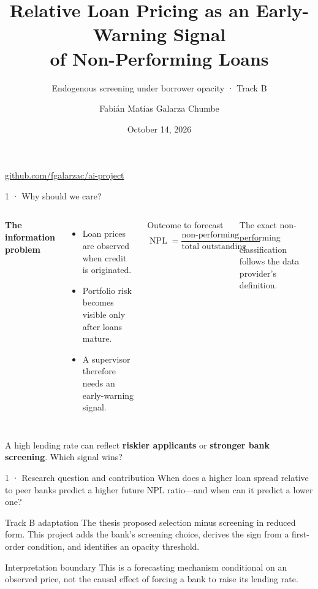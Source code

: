 \documentclass[aspectratio=169,11pt]{beamer}
\title{Relative Loan Pricing as an Early-Warning Signal\\of Non-Performing Loans}
\subtitle{Endogenous screening under borrower opacity · Track B}
\author{Fabián Matías Galarza Chumbe}
\date{October 14, 2026}
\newcommand{\npl}{\operatorname{NPL}}
\begin{document}
\begin{frame}[plain]
  \titlepage
  \vspace{-0.6em}
  \begin{center}\small
    \href{https://github.com/fgalarzac/ai-project}{github.com/fgalarzac/ai-project}
  \end{center}
\end{frame}

\begin{frame}{1 · Why should we care?}
  \begin{columns}[T,onlytextwidth]
      \textbf{The information problem}
      \begin{itemize}
        \item Loan prices are observed when credit is originated.
        \item Portfolio risk becomes visible only after loans mature.
        \item A supervisor therefore needs an \alert{early-warning signal}.
      \end{itemize}
      \begin{block}{Outcome to forecast}
        \centering
        \(\npl=\dfrac{\text{non-performing balance}}
        {\text{total outstanding balance}}\)
      \end{block}
      \small The exact non-performing classification follows the data
      provider's definition.
  \end{columns}
  \vfill
  \centering
  A high lending rate can reflect \textbf{riskier applicants} or
  \textbf{stronger bank screening}. Which signal wins?
\end{frame}

\begin{frame}{1 · Research question and contribution}
  \Large
  When does a higher loan spread relative to peer banks predict a
  \alert{higher} future NPL ratio---and when can it predict a \alert{lower} one?

  \vspace{0.8em}
  \normalsize
  \begin{block}{Track B adaptation}
    The thesis proposed selection minus screening in reduced form. This project
    adds the bank's screening choice, derives the sign from a first-order
    condition, and identifies an opacity threshold.
  \end{block}
  \begin{alertblock}{Interpretation boundary}
    This is a forecasting mechanism conditional on an observed price, not the
    causal effect of forcing a bank to raise its lending rate.
  \end{alertblock}
\end{frame}
\end{document}
